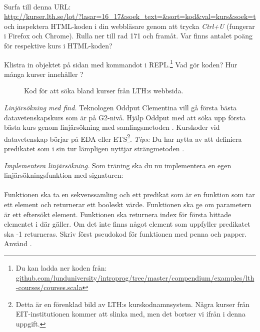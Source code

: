 \QUESTEND





\QUESTBEGIN

\Task \label{task:linsearch-lth} \what~

\Subtask Surfa till denna URL:\\ {\nolinebreak[4]\footnotesize\url{http://kurser.lth.se/lot/?lasar=16_17&soek_text=&sort=kod&val=kurs&soek=t}}
\\
och inspektera HTML-koden i din webbläsare genom att trycka \emph{Ctrl+U} (fungerar i Firefox och Chrome). Rulla ner till rad 171 och framåt. Var finns antalet poäng för respektive kurs i HTML-koden?

\Subtask \label{subtask:download-lthcourses} Klistra in objektet  på sidan \pageref{lth-courses} med kommandot  i REPL.\footnote{Du kan ladda ner koden från: \\ \href{https://raw.githubusercontent.com/lunduniversity/introprog/master/compendium/examples/lth-courses/courses.scala}{github.com/lunduniversity/introprog/tree/master/compendium/examples/lth-courses/courses.scala}} Vad gör koden? Hur många kurser innehåller ?

\begin{figure}
  \caption{Kod för att söka bland kurser från LTH:s webbsida.}
  \label{lth-courses}
\end{figure}


\Subtask \emph{Linjärsökning med find.} Teknologen Oddput Clementina vill gå första bästa datavetenskapskurs som är på G2-nivå. Hjälp Oddput med att söka upp första bästa kurs genom linjärsökning med samlingsmetoden . Kurskoder vid datavetenskap börjar på EDA eller ETS\footnote{Detta är en förenklad bild av LTH:s kurskodnamnsystem. Några kurser från EIT-institutionen  kommer att slinka med, men det bortser vi ifrån i denna uppgift.}. \emph{Tips:} Du har nytta av att definiera predikatet  som i sin tur lämpligen nyttjar strängmetoden .

\Subtask \emph{Implementera linjärsökning.} Som träning ska du nu implementera en egen linjärsökningsfunktion med signaturen: \\ 
\\ Funktionen ska ta en sekvenssamling  och ett predikat  som är en funktion som tar ett element och returnerar ett booleskt värde. Funktionen  ska ge  om parametern är ett eftersökt element. Funktionen  ska returnera index för första hittade elementet i  där  gäller. Om det inte finns något element som uppfyller predikatet ska -1 returneras. Skriv först pseudokod för funktionen med penna och papper. Använd .

